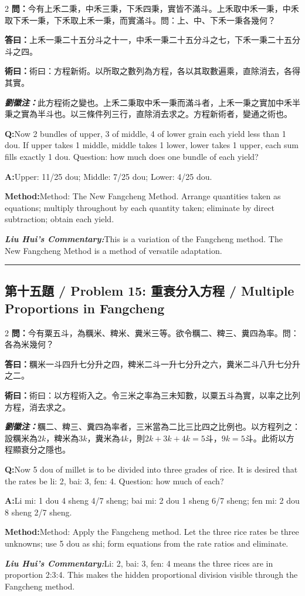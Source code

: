 \documentclass[11pt,a4paper]{article}
\newcommand{\cnwen}{\textcolor{cnlabelfg}{\textbf{問：}}}
\newcommand{\cnda}{\textbf{答曰：}}
\newcommand{\cnshu}{\textcolor{cnlabelfg}{\textbf{術曰：}}}
\newcommand{\cnzhu}{\textcolor{commentarycolor}{\textit{\textbf{劉徽注：}}}}
\newcommand{\enwen}{\textcolor{enlabelfg}{\textbf{Q:}}}
\newcommand{\enda}{\textcolor{enlabelfg}{\textbf{A:}}}
\newcommand{\enshu}{\textcolor{enlabelfg}{\textbf{Method:}}}
\newcommand{\enzhu}{\textcolor{enlabelfg}{\textit{\textbf{Liu Hui's Commentary:}}}}
\begin{document}
\begin{paracol}{2}
\switchcolumn[0]
\cnwen 今有上禾二秉，中禾三秉，下禾四秉，實皆不滿斗。上禾取中禾一秉，中禾取下禾一秉，下禾取上禾一秉，而實滿斗。問：上、中、下禾一秉各幾何？

\cnda 上禾一秉二十五分斗之十一，中禾一秉二十五分斗之七，下禾一秉二十五分斗之四。

\cnshu 術曰：方程新術。以所取之數列為方程，各以其取數遍乘，直除消去，各得其實。

\cnzhu 此方程術之變也。上禾二秉取中禾一秉而滿斗者，上禾一秉之實加中禾半秉之實為半斗也。以三條件列三行，直除消去求之。方程新術者，變通之術也。

\switchcolumn[1]
\enwen Now 2 bundles of upper, 3 of middle, 4 of lower grain each yield less than 1 dou. If upper takes 1 middle, middle takes 1 lower, lower takes 1 upper, each sum fills exactly 1 dou. Question: how much does one bundle of each yield?

\enda Upper: 11/25 dou; Middle: 7/25 dou; Lower: 4/25 dou.

\enshu Method: The New Fangcheng Method. Arrange quantities taken as equations; multiply throughout by each quantity taken; eliminate by direct subtraction; obtain each yield.

\enzhu This is a variation of the Fangcheng method. The New Fangcheng Method is a method of versatile adaptation.
\end{paracol}

\bigskip\hrule\bigskip

\subsection{第十五題 / Problem 15: 重衰分入方程 / Multiple Proportions in Fangcheng}

\begin{paracol}{2}
\switchcolumn[0]
\cnwen 今有粟五斗，為糲米、粺米、糞米三等。欲令糲二、粺三、糞四為率。問：各為米幾何？

\cnda 糲米一斗四升七分升之四，粺米二斗一升七分升之六，糞米二斗八升七分升之二。

\cnshu 術曰：以方程術入之。令三米之率為三未知數，以粟五斗為實，以率之比列方程，消去求之。

\cnzhu 糲二、粺三、糞四為率者，三米當為二比三比四之比例也。以方程列之：設糲米為$2k$，粺米為$3k$，糞米為$4k$，則$2k + 3k + 4k = 5$斗，$9k = 5$斗。此術以方程顯衰分之隱也。

\switchcolumn[1]
\enwen Now 5 dou of millet is to be divided into three grades of rice. It is desired that the rates be li: 2, bai: 3, fen: 4. Question: how much of each?

\enda Li mi: 1 dou 4 sheng 4/7 sheng; bai mi: 2 dou 1 sheng 6/7 sheng; fen mi: 2 dou 8 sheng 2/7 sheng.

\enshu Method: Apply the Fangcheng method. Let the three rice rates be three unknowns; use 5 dou as shi; form equations from the rate ratios and eliminate.

\enzhu Li: 2, bai: 3, fen: 4 means the three rices are in proportion 2:3:4. This makes the hidden proportional division visible through the Fangcheng method.
\end{paracol}
\end{document}
